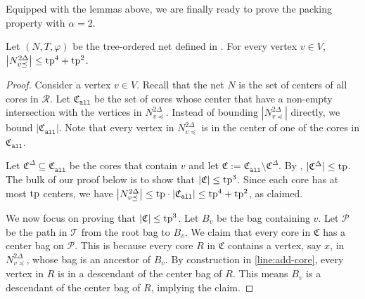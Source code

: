 \documentclass{theoretics}
\newcommand{\tp}{{\rm tp}}
\newcommand{\mP}{\mathcal{P}}
\def\coreSet{\mathcal{R}}
\def\core{R}
\def\C{\mathfrak{C}}
\begin{document}
Equipped with the lemmas above, we are finally ready to prove the packing property with $\alpha=2$.   


\begin{lemma}
	\label{lem:packing} Let $(N,T,\varphi)$ be the tree-ordered net defined in .
	For every vertex $v \in V$,  $\left|N_{v\preceq}^{2\Delta}\right|\le \tp^4 + \tp^2$.
\end{lemma}
\begin{proof}
	Consider a vertex $v \in V$. Recall that the net $N$ is the set of centers of all cores in $\coreSet$.  Let $\C_{\texttt{all}}$ be the set of cores whose center that have a non-empty intersection with the vertices in $N_{v\preceq}^{2\Delta}$. Instead of bounding $|N_{v\preceq}^{2\Delta}|$ directly, we bound $|\C_{\texttt{all}}|$. Note that every vertex in $N_{v\preceq}^{2\Delta}$ is in the center of one of the cores in $\C_{\texttt{all}}$. 
	
	Let $\C^{\Delta} \subseteq \C_{\texttt{all}}$ be the cores that contain $v$ and let $\C := \C_{\texttt{all}} \setminus \C^{\Delta}$.
	By , $|\C^{\Delta}| \leq \tp$. The bulk of our proof below is to show that $|\C|\le \tp^3$. Since each core has at most $\tp$ centers, we have $\left|N_{v\preceq}^{2\Delta}\right|\le \tp\cdot |\C_{\texttt{all}}| \leq \tp^4 + \tp^2$, as claimed. 
	
	
	We now focus on proving that $|\C| \le \tp^3$. Let $B_v$ be the bag containing $v$.  Let $\mP$ be the path in $\mathcal{T}$ from the root bag to $B_v$. We claim that every core in $\C$ has a center bag on $\mP$. This is because every core $\core$ in $\C$ contains a vertex, say $x$, in $N_{v\preceq}^{2\Delta}$, whose bag is an ancestor of  $B_v$. By construction in \cref{line:add-core}, every vertex in $\core$ is in a descendant of the center bag of $\core$. This means $B_v$ is a descendant of the center bag of $\core$, implying the claim. 
	

\end{proof}
\end{document}

